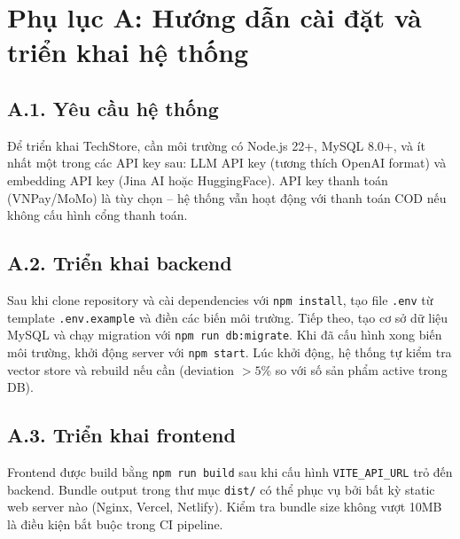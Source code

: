 \chapter*{Phụ lục A: Hướng dẫn cài đặt và triển khai hệ thống}
\label{sec:c4_deployment}

\section*{A.1. Yêu cầu hệ thống}

Để triển khai TechStore, cần môi trường có Node.js 22+, MySQL 8.0+, và ít nhất một trong các API key sau: LLM API key (tương thích OpenAI format) và embedding API key (Jina AI hoặc HuggingFace). API key thanh toán (VNPay\slash MoMo) là tùy chọn -- hệ thống vẫn hoạt động với thanh toán COD nếu không cấu hình cổng thanh toán.

\section*{A.2. Triển khai backend}

Sau khi clone repository và cài dependencies với \texttt{npm install}, tạo file \texttt{.env} từ template \texttt{.env.example} và điền các biến môi trường. Tiếp theo, tạo cơ sở dữ liệu MySQL và chạy migration với \texttt{npm run db:migrate}. Khi đã cấu hình xong biến môi trường, khởi động server với \texttt{npm start}. Lúc khởi động, hệ thống tự kiểm tra vector store và rebuild nếu cần (deviation $>5\%$ so với số sản phẩm active trong DB).

\section*{A.3. Triển khai frontend}

Frontend được build bằng \texttt{npm run build} sau khi cấu hình \texttt{VITE\_API\_URL} trỏ đến backend. Bundle output trong thư mục \texttt{dist/} có thể phục vụ bởi bất kỳ static web server nào (Nginx, Vercel, Netlify). Kiểm tra bundle size không vượt 10MB là điều kiện bắt buộc trong CI pipeline.
